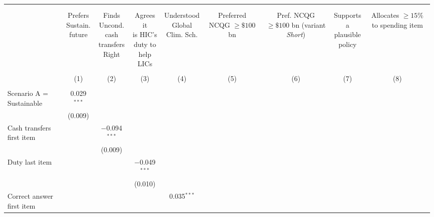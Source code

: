 
\begin{tabular}{@{\extracolsep{5pt}}lcccccccc} 
\\[-1.8ex]\hline 
\hline \\[-1.8ex] 
\\[-1.8ex] & \makecell{Prefers\\Sustain.\\future} & \makecell{Finds\\Uncond.\\cash\\transfers\\Right} & \makecell{Agrees it\\is HIC's\\duty to\\help LICs} & \makecell{Understood\\Global\\Clim. Sch.} & \makecell{Preferred\\NCQG\\$\geq\$ 100$ bn} & \makecell{Pref. NCQG\\$\geq\$ 100$ bn\\(variant\\ \textit{Short})} & \makecell{Supports\\a\\plausible\\policy} & \makecell{Allocates\\$\geq 15\%$ to\\spending\\item} \\ 
\\[-1.8ex] & (1) & (2) & (3) & (4) & (5) & (6) & (7) & (8)\\ 
\hline \\[-1.8ex] 
 Scenario A = Sustainable & 0.029$^{***}$ &  &  &  &  &  &  &  \\ 
  & (0.009) &  &  &  &  &  &  &  \\ 
  Cash transfers first item &  & $-$0.094$^{***}$ &  &  &  &  &  &  \\ 
  &  & (0.009) &  &  &  &  &  &  \\ 
  Duty last item &  &  & $-$0.049$^{***}$ &  &  &  &  &  \\ 
  &  &  & (0.010) &  &  &  &  &  \\ 
  Correct answer first item &  &  &  & 0.035$^{***}$ &  &  &  &  \\ 

\end{tabular}
